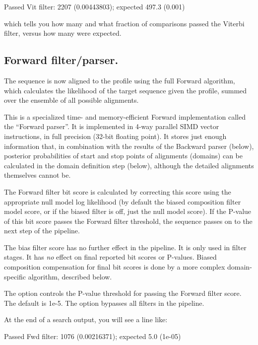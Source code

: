 \begin{sreoutput}
Passed Vit filter:                      2207  (0.00443803); expected 497.3 (0.001)
\end{sreoutput}

which tells you how many and what fraction of comparisons passed the
Viterbi filter, versus how many were expected.
 
  

\subsection{Forward filter/parser.}

The sequence is now aligned to the profile using the full Forward
algorithm, which calculates the likelihood of the target sequence
given the profile, summed over the ensemble of all possible
alignments.

This is a specialized time- and memory-efficient Forward
implementation called the ``Forward parser''. It is implemented in
4-way parallel SIMD vector instructions, in full precision (32-bit
floating point). It stores just enough information that, in
combination with the results of the Backward parser (below), posterior
probabilities of start and stop points of alignments (domains) can be
calculated in the domain definition step (below), although the
detailed alignments themselves cannot be.

The Forward filter bit score is calculated by correcting this score
using the appropriate null model log likelihood (by default the biased
composition filter model score, or if the biased filter is off, just
the null model score). If the P-value of this bit score passes the
Forward filter threshold, the sequence passes on to the next step of
the pipeline.

The bias filter score has no further effect in the pipeline. It is
only used in filter stages. It has \emph{no} effect on final reported
bit scores or P-values. Biased composition compensation for final bit
scores is done by a more complex domain-specific algorithm, described
below.

The  option controls the P-value threshold for passing
the Forward filter score. The default is 1e-5.  The 
option bypasses all filters in the pipeline.

At the end of a search output, you will see a line like:

\begin{sreoutput}
Passed Fwd filter:                      1076  (0.00216371); expected 5.0 (1e-05)
\end{sreoutput}

